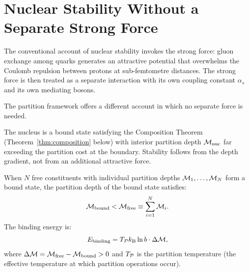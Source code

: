 \section{Nuclear Stability Without a Separate Strong Force}
\label{sec:nuclear_stability}

The conventional account of nuclear stability invokes the strong force: gluon
exchange among quarks generates an attractive potential that overwhelms the
Coulomb repulsion between protons at sub-femtometre distances. The strong force
is then treated as a separate interaction with its own coupling constant $\alpha_s$
and its own mediating bosons.

The partition framework offers a different account in which no separate force
is needed.

\begin{proposition}
\label{prop:nuclear_depth}
The nucleus is a bound state satisfying the Composition Theorem
(Theorem~\ref{thm:composition} below) with interior partition depth
$\mathcal{M}_{\mathrm{nuc}}$ far exceeding the partition cost at the boundary.
Stability follows from the depth gradient, not from an additional attractive force.
\end{proposition}

\begin{theorem}
\label{thm:composition}
When $N$ free constituents with individual partition depths
$\mathcal{M}_1, \ldots, \mathcal{M}_N$ form a bound state, the partition depth of the
bound state satisfies:
\begin{equation}
  \mathcal{M}_{\mathrm{bound}} < \mathcal{M}_{\mathrm{free}} \equiv \sum_{i=1}^N \mathcal{M}_i.
  \label{eq:composition_depth}
\end{equation}
The binding energy is:
\begin{equation}
  E_{\mathrm{binding}} = T_{\mathcal{P}} k_{\mathrm{B}} \ln b \cdot \Delta\mathcal{M},
  \label{eq:binding_energy}
\end{equation}
where $\Delta\mathcal{M} = \mathcal{M}_{\mathrm{free}} - \mathcal{M}_{\mathrm{bound}} > 0$ and $T_{\mathcal{P}}$ is the partition
temperature (the effective temperature at which partition operations occur).
\end{theorem}

